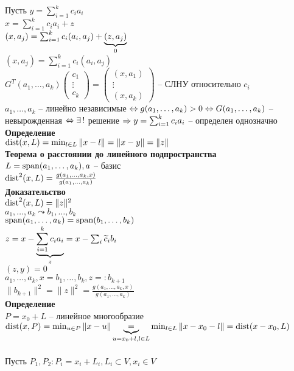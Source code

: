 \documentclass[12pt]{article}
\begin{document}
Пусть $y = \sum_{i=1}^k c_i a_i$\\
$x = \sum_{i=1}^k c_ia_i + z$\\
$(x, a_j) = \sum_{i=1}^k c_i (a_i, a_j) + \ub0{(z, a_j)}$\\
$(x, a_j) = \sum_{i=1}^k c_i (a_i, a_j)$\\
$G^T(a_1, \ldots, a_k)\begin{pmatrix}
    c_1\\\vdots\\c_k
\end{pmatrix} = \begin{pmatrix}
    (x, a_1)\\\vdots\\(x,a_k)
\end{pmatrix}$ -- СЛНУ относительно $c_i$\\
$a_1, \ldots, a_k$ -- линейно независимые $\LRto g(a_1, \ldots, a_k) > 0 \LRto G(a_1,\ldots, a_k)$ -- невырожденная $\LRto \ex!$ решение $\Rto y = \sum_{i=1}^k c_i a_i$ -- определен однозначно\\
\textbf{Определение}\\
$\dist(x, L) = \min_{l\in L} \|x-l\| = \|x-y\|=\|z\|$\\
\textbf{Теорема о расстоянии до линейного подпространства}\\
$L = \span(a_1, \ldots, a_k), a$ -- базис\\
$\dist^2(x,L) = \frac{g(a_1, \ldots, a_k, x)}{g(a_1, \ldots, a_k)}$\\
\textbf{Доказательство}\\
$\dist^2(x,L) = \|z\|^2$\\
$a_1, \ldots, a_k \leadsto b_1, \ldots, b_k$\\
$\span(a_1, \ldots, a_k) = \span(b_1, \ldots, b_k)$\\
$z = x - \ub{z}{\sum_{i=1}^k c_ia_i} = x - \sum_i \ot c_i b_i$\\
$(z, y) = 0$\\
$a_1, \ldots, a_k, x = b_1, \ldots, b_k, z =: b_{k+1}$\\
$\|b_{k+1}\|^2 = \|z\|^2 = \frac{g(a_1, \ldots, a_k, x)}{g(a_1, \ldots, a_k)}$\\
\textbf{Определение}\\
$P = x_0 + L$ -- линейное многообразие\\
$\dist(x, P) = \min_{u \in P} \|x-u\| \ub{u = x_0 + l, l \in L}= \min_{l \in L} \|x-x_0-l\| = \dist(x-x_0, L)$\\\\
Пусть $P_1, P_2: P_i = x_i + L_i, L_i \subset V, x_i \in V$\\
\end{document}
